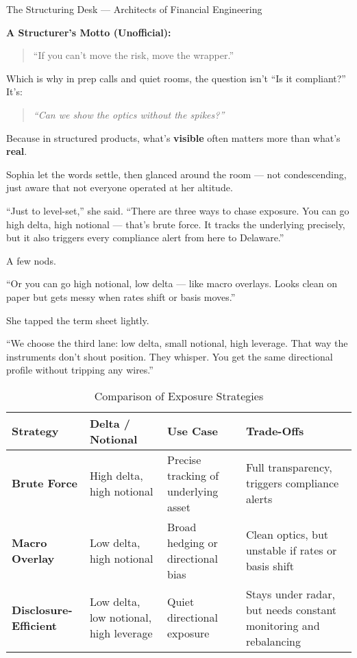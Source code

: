 \begin{TechnicalSidebar}{The Structuring Desk — Architects of Financial Engineering}
    \bigskip
    
    \textbf{A Structurer’s Motto (Unofficial):}  
    \begin{quote}
      “If you can’t move the risk, move the wrapper.”
    \end{quote}
    
    Which is why in prep calls and quiet rooms, the question isn’t “Is it compliant?”  
    It’s:  
    \begin{quote}
      \textit{“Can we show the optics without the spikes?”}
    \end{quote}
    
    Because in structured products, what’s \textbf{visible} often matters more than what’s \textbf{real}.
    

\end{TechnicalSidebar}

\medskip

Sophia let the words settle, then glanced around the room — not condescending, just aware that not 
everyone operated at her altitude.

“Just to level-set,” she said. “There are three ways to chase exposure. You can go high delta, high 
notional — that’s brute force. It tracks the underlying precisely, but it also triggers every compliance 
alert from here to Delaware.”

A few nods.

“Or you can go high notional, low delta — like macro overlays. Looks clean on paper but gets messy when 
rates shift or basis moves.”

She tapped the term sheet lightly.

“We choose the third lane: low delta, small notional, high leverage. That way the instruments don’t shout 
position. They whisper. You get the same directional profile without tripping any wires.”

\medskip


\begin{table}[H]
\centering
\caption{Comparison of Exposure Strategies}
\begin{tabularx}{\textwidth}{|X|X|X|X|}
\hline
\textbf{Strategy} & \textbf{Delta / Notional} & \textbf{Use Case} & \textbf{Trade-Offs} \\
\hline
\textbf{Brute Force} & High delta, high notional & Precise tracking of underlying asset & Full transparency, triggers compliance alerts \\
\hline
\textbf{Macro Overlay} & Low delta, high notional & Broad hedging or directional bias & Clean optics, but unstable if rates or basis shift \\
\hline
\textbf{Disclosure-Efficient} & Low delta, low notional, high leverage & Quiet directional exposure & Stays under radar, but needs constant monitoring and rebalancing \\
\hline
\end{tabularx}
\end{table}




